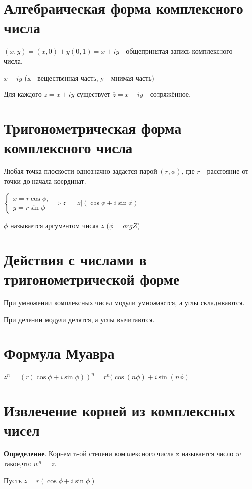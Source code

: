\documentclass[a4paper]{article}
\begin{document}
\section*{Алгебраическая форма комплексного числа}
$(x,y) = (x,0) + y(0,1) = x+iy$ - общепринятая запись комплексного числа.

$x+iy$ (x - вещественная часть, y - мнимая часть)

Для каждого $z = x+iy$ существует $\overline{z} = x-iy$ - сопряжённое.


\section*{Тригонометрическая форма комплексного числа}

Любая точка плоскости однозначно задается парой $(r, \phi)$, где $r$ - расстояние от точки до начала координат.

$\displaystyle \begin{cases}
x = r \cos \phi,
\\
y = r \sin \phi
\end{cases} \Rightarrow z = |z| (\cos \phi + i \sin \phi)$

$\phi$ называется аргументом числа $z$ ($\phi = argZ$)

\section*{Действия с числами в тригонометрической форме}

При умножении комплексных чисел модули умножаются, а углы складываются.

При делении модули делятся, а углы вычитаются.



\section*{Формула Муавра}
 $z^n = (r(\cos \phi + i \sin \phi))^n = r^n ( \cos(n \phi) + i \sin(n \phi)$

\section*{Извлечение корней из комплексных чисел
}
\textbf{Определение}. Корнем n-ой степени комплексного числа z называется число $w$ такое,\newline что $w^n = z$.


Пусть $z = r(\cos \phi + i \sin \phi)$
\end{document}
